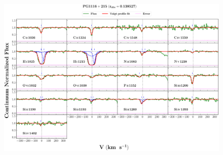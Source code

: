 \documentclass[12pt]{report}
\begin{document}
\begin{landscape}

\begin{figure}
    \centering
    \vspace{-20mm}
    \hspace*{-35mm}
    \includegraphics[width=1.25\linewidth]{System-Plots/PG1116+215_z=0.138527_sys_plot.png}
\end{figure}

\end{landscape}
\end{document}
